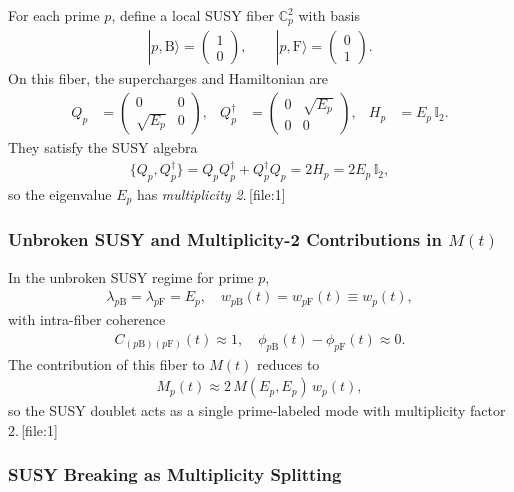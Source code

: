 \documentclass[11pt]{article}
\begin{document}
For each prime \(p\), define a local SUSY fiber \(\mathbb{C}_p^2\) with basis
\begin{align}
|p,\mathrm{B}\rangle =
\begin{pmatrix}1\\0\end{pmatrix},\qquad
|p,\mathrm{F}\rangle =
\begin{pmatrix}0\\1\end{pmatrix}.
\end{align}
On this fiber, the supercharges and Hamiltonian are
\begin{align}
Q_p
&=
\begin{pmatrix}
0 & 0\\
\sqrt{E_p} & 0
\end{pmatrix},
&
Q_p^\dagger
&=
\begin{pmatrix}
0 & \sqrt{E_p}\\
0 & 0
\end{pmatrix},
&
H_p
&=
E_p\,\mathbb{I}_2.
\end{align}
They satisfy the SUSY algebra
\begin{align}
\{Q_p,Q_p^\dagger\}
=
Q_p Q_p^\dagger + Q_p^\dagger Q_p
=
2H_p
=
2E_p\,\mathbb{I}_2,
\end{align}
so the eigenvalue \(E_p\) has \emph{multiplicity 2}.\,[file:1]

\subsubsection{Unbroken SUSY and Multiplicity-2 Contributions in \(M(t)\)}

In the unbroken SUSY regime for prime \(p\),
\begin{align}
\lambda_{p\mathrm{B}} = \lambda_{p\mathrm{F}} = E_p,\quad
w_{p\mathrm{B}}(t) = w_{p\mathrm{F}}(t) \equiv w_p(t),
\end{align}
with intra-fiber coherence
\begin{align}
C_{(p\mathrm{B})(p\mathrm{F})}(t)\approx 1,\quad
\phi_{p\mathrm{B}}(t)-\phi_{p\mathrm{F}}(t)\approx 0.
\end{align}
The contribution of this fiber to \(M(t)\) reduces to
\begin{align}
M_p(t)
\approx
2\,M(E_p,E_p)\,w_p(t),
\end{align}
so the SUSY doublet acts as a single prime-labeled mode with multiplicity factor \(2\).\,[file:1]

\subsubsection{SUSY Breaking as Multiplicity Splitting}
\end{document}
